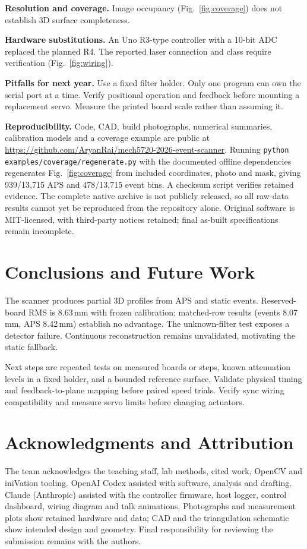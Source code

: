 \documentclass[10pt,journal,compsoc]{IEEEtran}
\begin{document}
\textbf{Resolution and coverage.} Image occupancy (Fig.~\ref{fig:coverage}) does not establish 3D surface completeness.

\textbf{Hardware substitutions.} An Uno R3-type controller with a 10-bit ADC replaced the planned R4. The reported laser connection and class require verification (Fig.~\ref{fig:wiring}).

\textbf{Pitfalls for next year.} Use a fixed filter holder. Only one program can own the serial port at a time. Verify positional operation and feedback before mounting a replacement servo. Measure the printed board scale rather than assuming it.

\textbf{Reproducibility.} Code, CAD, build photographs, numerical summaries, calibration models and a coverage example are public at \url{https://github.com/AryanRai/mech5720-2026-event-scanner}. Running \texttt{python examples/coverage/regenerate.py} with the documented offline dependencies regenerates Fig.~\ref{fig:coverage} from included coordinates, photo and mask, giving 939/13,715 APS and 478/13,715 event bins. A checksum script verifies retained evidence. The complete native archive is not publicly released, so all raw-data results cannot yet be reproduced from the repository alone. Original software is MIT-licensed, with third-party notices retained; final as-built specifications remain incomplete.

\section{Conclusions and Future Work}
The scanner produces partial 3D profiles from APS and static events. Reserved-board RMS is 8.63\,mm with frozen calibration; matched-row results (events 8.07\,mm, APS 8.42\,mm) establish no advantage. The unknown-filter test exposes a detector failure. Continuous reconstruction remains unvalidated, motivating the static fallback.

Next steps are repeated tests on measured boards or steps, known attenuation levels in a fixed holder, and a bounded reference surface. Validate physical timing and feedback-to-plane mapping before paired speed trials. Verify sync wiring compatibility and measure servo limits before changing actuators.

\section*{Acknowledgments and Attribution}
The team acknowledges the teaching staff, lab methods, cited work, OpenCV and iniVation tooling. OpenAI Codex assisted with software, analysis and drafting. Claude (Anthropic) assisted with the controller firmware, host logger, control dashboard, wiring diagram and talk animations. Photographs and measurement plots show retained hardware and data; CAD and the triangulation schematic show intended design and geometry. Final responsibility for reviewing the submission remains with the authors.



\end{document}
